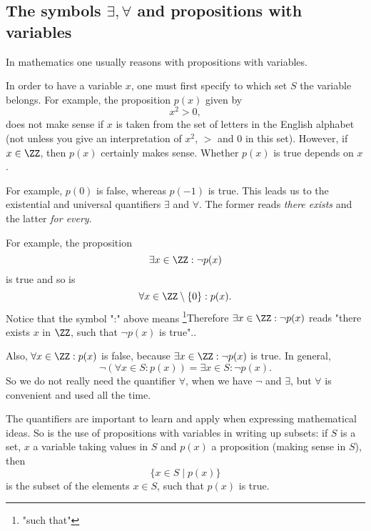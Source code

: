 \documentclass{article}
\begin{document}



\subsection{The symbols $\exists, \forall$ and propositions with variables}

In mathematics one usually reasons with propositions with variables.

In order to have a variable $x$, one must first specify to which set
$S$ the variable belongs. For example, the proposition $p(x)$ given by
$$
x^2 > 0,
$$
does not make sense if $x$ is taken from the set of letters in the
English alphabet (not unless you give an interpretation of $x^2$,
$>$ and $0$ in this set). However, if $x\in \ZZ$, then $p(x)$
certainly makes sense. Whether $p(x)$ is true depends on $x$.


For example, $p(0)$ is false, whereas $p(-1)$ is true. This leads us to
the existential and universal quantifiers $\exists$ and $\forall$.
The former reads \emph{there exists} and the latter \emph{for every}.

For example, the proposition
$$
\exists x\in \ZZ: \neg p(x)
$$
is true and so is
$$
\forall x\in \ZZ\setminus\{0\}: p(x).
$$
Notice that the  symbol ":" above means \footnote{"such that"}{Therefore  
$\exists x\in \ZZ: \neg p(x)$ reads "there exists $x$ in $\ZZ$, such that
$\neg p(x)$ is true".}.

Also, $\forall x\in \ZZ: p(x)$ is false, because
$\exists x\in \ZZ: \neg p(x)$ is true. In general,
$$
\neg\left(\forall x\in S: p(x)\right) = \exists x\in S: \neg p(x).
$$
So we do not really need the quantifier $\forall$, when we have
$\neg$ and $\exists$, but $\forall$ is convenient and used all
the time.

The quantifiers are important to learn and apply when expressing
mathematical ideas. So is the use of propositions with variables
in writing up subsets: if $S$ is a set, $x$ a variable taking values
in $S$ and $p(x)$ a proposition (making sense in $S$), then
$$
\{x\in S \mid p(x)\}
$$
is the subset of the elements $x\in S$, such that $p(x)$ is true.
\end{document}
